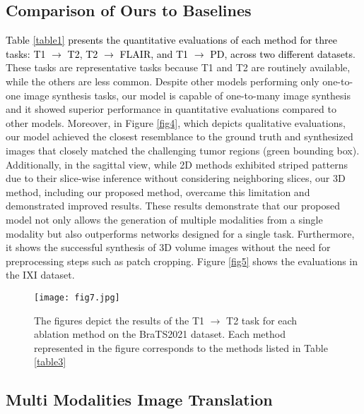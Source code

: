 \documentclass[10pt,twocolumn,letterpaper]{article}
\newcommand{\jhk}[2]{\textcolor{black}{{}#2}}
\begin{document}
\subsection{Comparison of Ours to Baselines}
 \jhk{}{Table \ref{table1} presents the quantitative evaluations of each method for three tasks: T1 $\rightarrow$ T2, T2 $\rightarrow$ FLAIR, and T1 $\rightarrow$ PD, across two different datasets}. These tasks are representative tasks because T1 and T2 are routinely available, while the others are less common. Despite other models performing only one-to-one image synthesis tasks, our model is capable of one-to-many image synthesis and it showed superior performance in quantitative evaluations compared to other models. Moreover, in Figure \ref{fig4}, which depicts qualitative evaluations, our model achieved the closest resemblance to the ground truth and synthesized images that closely matched the challenging tumor regions (green bounding box). Additionally, in the sagittal view, while 2D methods exhibited striped patterns due to their slice-wise inference without considering neighboring slices, our 3D method, including our proposed method, overcame this limitation and demonstrated improved results. These results demonstrate that our proposed model not only allows the generation of multiple modalities from a single modality but also outperforms networks designed for a single task. Furthermore, it shows the successful synthesis of 3D volume images without the need for preprocessing steps such as patch cropping. Figure \ref{fig5} shows the evaluations in the IXI dataset.

\begin{figure*} [ht]
    \texttt{[image: fig7.jpg]}
    \vspace{-12pt}
    \caption{ The figures depict the results of the T1 $\rightarrow$ T2 task for each ablation method on the BraTS2021 dataset. Each method represented in the figure corresponds to the methods listed in Table \ref{table3}}
    \vspace{-8pt}
    \label{fig7}
\end{figure*}

\subsection{Multi Modalities Image Translation}
\end{document}
